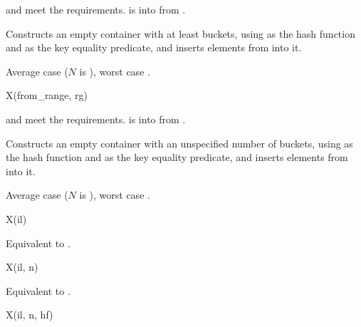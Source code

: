 \begin{itemdescr}
\pnum
\expects
{} and  meet
the  requirements.
 is
 into 
from .

\pnum
\effects
Constructs an empty container with at least  buckets,
using  as the hash function and
 as the key equality predicate, and
inserts elements from  into it.

\pnum
\complexity
Average case  ($N$ is ),
worst case .
\end{itemdescr}

\begin{itemdecl}
X(from_range, rg)
\end{itemdecl}

\begin{itemdescr}
\pnum
\expects
{} and  meet
the  requirements.
 is
 into 
from .

\pnum
\effects
Constructs an empty container with an unspecified number of buckets,
using  as the hash function and
 as the key equality predicate, and
inserts elements from  into it.

\pnum
\complexity
Average case  ($N$ is ),
worst case .
\end{itemdescr}

\begin{itemdecl}
X(il)
\end{itemdecl}

\begin{itemdescr}
\pnum
\effects
Equivalent to .
\end{itemdescr}

\begin{itemdecl}
X(il, n)
\end{itemdecl}

\begin{itemdescr}
\pnum
\effects
Equivalent to  .
\end{itemdescr}

\begin{itemdecl}
X(il, n, hf)
\end{itemdecl}

